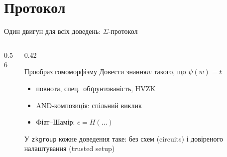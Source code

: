 \documentclass[aspectratio=169, 10pt, xcolor=svgnames]{beamer}
\begin{document}
\section{Протокол}
\begin{frame}{Один двигун для всіх доведень: $\Sigma$-протокол}
  \begin{columns}[T]
    \begin{column}{0.56\textwidth}
      \centering
      \resizebox{\linewidth}{!}{}
    \end{column}
    \begin{column}{0.42\textwidth}
      \begin{block}{Прообраз гомоморфізму}
        Довести знання\footnotemark[1] $w$ такого, що $\psi(w)=t$
      \end{block}
      \begin{itemize}\small
        \item повнота, спец.\ обґрунтованість, HVZK
        \item AND-композиція: спільний виклик
        \item Фіат--Шамір\footnotemark[2]: $c = H(\dots)$
      \end{itemize}
      \begin{alertblock}{У \texttt{zkgroup}}
        \small кожне доведення таке: без схем (circuits) і довіреного налаштування (trusted setup)
      \end{alertblock}
    \end{column}
  \end{columns}
\end{frame}

\end{document}
